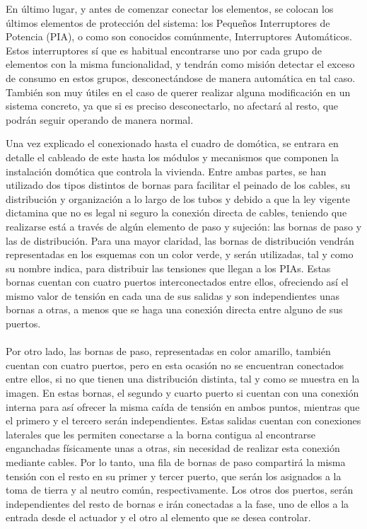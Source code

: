 \begin{itemize}
En último lugar, y antes de comenzar conectar los elementos, se colocan los últimos elementos de protección del sistema: los Pequeños Interruptores de Potencia (PIA), o como son conocidos comúnmente, Interruptores Automáticos. Estos interruptores sí que es habitual encontrarse uno por cada grupo de elementos con la misma funcionalidad, y tendrán como misión detectar el exceso de consumo en estos grupos, desconectándose de manera automática en tal caso. También son muy útiles en el caso de querer realizar alguna modificación en un sistema concreto, ya que si es preciso desconectarlo, no afectará al resto, que podrán seguir operando de manera normal.
\end{itemize} 
 \vspace{1cm}
Una vez explicado el conexionado hasta el cuadro de domótica, se entrara en detalle el cableado de este hasta los módulos y mecanismos que componen la instalación domótica que controla la vivienda. Entre ambas partes, se han utilizado dos tipos distintos de bornas para facilitar el peinado de los cables, su distribución y organización a lo largo de los tubos y debido a que la ley vigente dictamina que no es legal ni seguro la conexión directa de cables, teniendo que realizarse está a través de algún elemento de paso y sujeción: las bornas de paso y las de distribución. Para una mayor claridad, las bornas de distribución vendrán representadas en los esquemas con un color verde, y serán utilizadas, tal y como su nombre indica, para distribuir las tensiones que llegan a los PIAs. Estas bornas cuentan con cuatro puertos interconectados entre ellos, ofreciendo así el mismo valor de tensión en cada una de sus salidas y son independientes unas bornas a otras, a menos que se haga una conexión directa entre alguno de sus puertos. \\\\
Por otro lado, las bornas de paso, representadas en color amarillo, también cuentan con cuatro puertos, pero en esta ocasión no se encuentran conectados entre ellos, si no que tienen una distribución distinta, tal y como se muestra en la imagen. En estas bornas, el segundo y cuarto puerto si cuentan con una conexión interna para así ofrecer la misma caída de tensión en ambos puntos, mientras que el primero y el tercero serán independientes. Estas salidas cuentan con conexiones laterales que les permiten conectarse a la borna contigua al encontrarse enganchadas físicamente unas a otras, sin necesidad de realizar esta conexión mediante cables. Por lo tanto, una fila de bornas de paso compartirá la misma tensión con el resto en su primer y tercer puerto, que serán los asignados a la toma de tierra y al neutro común, respectivamente. Los otros dos puertos, serán independientes del resto de bornas e irán conectadas a la fase, uno de ellos a la entrada desde el actuador y el otro al elemento que se desea controlar.

